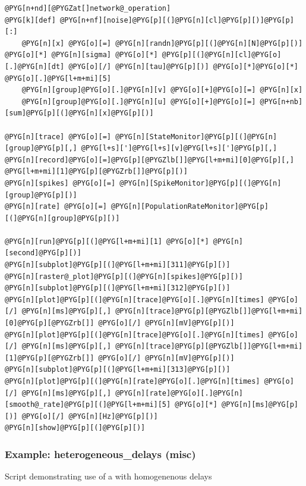 \documentclass[letterpaper,10pt,english]{manual}
\begin{document}
\begin{Verbatim}[commandchars=@\[\]]
@PYG[n+nd][@PYGZat[]network@_operation]
@PYG[k][def] @PYG[n+nf][noise]@PYG[p][(]@PYG[n][cl]@PYG[p][)]@PYG[p][:]
    @PYG[n][x] @PYG[o][=] @PYG[n][randn]@PYG[p][(]@PYG[n][N]@PYG[p][)] @PYG[o][*] @PYG[n][sigma] @PYG[o][*] @PYG[p][(]@PYG[n][cl]@PYG[o][.]@PYG[n][dt] @PYG[o][/] @PYG[n][tau]@PYG[p][)] @PYG[o][*]@PYG[o][*] @PYG[o][.]@PYG[l+m+mi][5]
    @PYG[n][group]@PYG[o][.]@PYG[n][v] @PYG[o][+]@PYG[o][=] @PYG[n][x]
    @PYG[n][group]@PYG[o][.]@PYG[n][u] @PYG[o][+]@PYG[o][=] @PYG[n+nb][sum]@PYG[p][(]@PYG[n][x]@PYG[p][)]

@PYG[n][trace] @PYG[o][=] @PYG[n][StateMonitor]@PYG[p][(]@PYG[n][group]@PYG[p][,] @PYG[l+s][']@PYG[l+s][v]@PYG[l+s][']@PYG[p][,] @PYG[n][record]@PYG[o][=]@PYG[p][@PYGZlb[]]@PYG[l+m+mi][0]@PYG[p][,] @PYG[l+m+mi][1]@PYG[p][@PYGZrb[]]@PYG[p][)]
@PYG[n][spikes] @PYG[o][=] @PYG[n][SpikeMonitor]@PYG[p][(]@PYG[n][group]@PYG[p][)]
@PYG[n][rate] @PYG[o][=] @PYG[n][PopulationRateMonitor]@PYG[p][(]@PYG[n][group]@PYG[p][)]

@PYG[n][run]@PYG[p][(]@PYG[l+m+mi][1] @PYG[o][*] @PYG[n][second]@PYG[p][)]
@PYG[n][subplot]@PYG[p][(]@PYG[l+m+mi][311]@PYG[p][)]
@PYG[n][raster@_plot]@PYG[p][(]@PYG[n][spikes]@PYG[p][)]
@PYG[n][subplot]@PYG[p][(]@PYG[l+m+mi][312]@PYG[p][)]
@PYG[n][plot]@PYG[p][(]@PYG[n][trace]@PYG[o][.]@PYG[n][times] @PYG[o][/] @PYG[n][ms]@PYG[p][,] @PYG[n][trace]@PYG[p][@PYGZlb[]]@PYG[l+m+mi][0]@PYG[p][@PYGZrb[]] @PYG[o][/] @PYG[n][mV]@PYG[p][)]
@PYG[n][plot]@PYG[p][(]@PYG[n][trace]@PYG[o][.]@PYG[n][times] @PYG[o][/] @PYG[n][ms]@PYG[p][,] @PYG[n][trace]@PYG[p][@PYGZlb[]]@PYG[l+m+mi][1]@PYG[p][@PYGZrb[]] @PYG[o][/] @PYG[n][mV]@PYG[p][)]
@PYG[n][subplot]@PYG[p][(]@PYG[l+m+mi][313]@PYG[p][)]
@PYG[n][plot]@PYG[p][(]@PYG[n][rate]@PYG[o][.]@PYG[n][times] @PYG[o][/] @PYG[n][ms]@PYG[p][,] @PYG[n][rate]@PYG[o][.]@PYG[n][smooth@_rate]@PYG[p][(]@PYG[l+m+mi][5] @PYG[o][*] @PYG[n][ms]@PYG[p][)] @PYG[o][/] @PYG[n][Hz]@PYG[p][)]
@PYG[n][show]@PYG[p][(]@PYG[p][)]
\end{Verbatim}

\resetcurrentobjects
\hypertarget{--doc-examples-misc_heterogeneous_delays}{}

\hypertarget{index-49}{}\subsubsection{Example: heterogeneous\_delays (misc)}

Script demonstrating use of a \hyperlink{brian.Connection}{} with homogenenous delays
\end{document}
